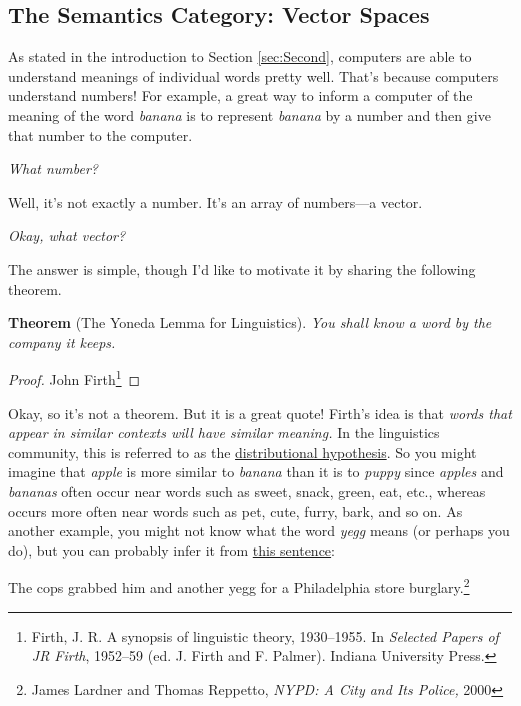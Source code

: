 \documentclass{tufte-handout-tai}
\theoremstyle{plain}
\newtheorem{thm}{Theorem}[section]
\theoremstyle{definition}
\theoremstyle{remark}
\begin{document}
\subsection*{The Semantics Category: Vector Spaces}
As stated in the introduction to Section \ref{sec:Second}, computers are able to understand meanings of individual words pretty well. That's because computers understand numbers! For example, a great way to inform a computer of the meaning of the word \textit{banana}  is to represent \textit{banana} by a number and then give that number to the computer.

\vspace{0.4cm}
\noindent \textit{What number?}
\vspace{0.4cm}

\noindent Well, it's not exactly a number. It's an array of numbers---a vector.

\vspace{0.4cm}
\noindent \textit{Okay, what vector?}
\vspace{0.4cm}

\noindent The answer is simple, though I'd like to motivate it by sharing the following theorem.

\vspace{0.4cm}
\noindent\textbf{Theorem} (The Yoneda Lemma for Linguistics). \textit{You shall know a word by the company it keeps.}
\begin{proof}
John Firth\footnote[][-1cm]{Firth, J. R. A synopsis of linguistic theory, 1930--1955. In \textit{Selected Papers of JR Firth}, 1952--59 (ed. J. Firth and F. Palmer). Indiana University Press.}
\end{proof}


Okay, so it's not a theorem. But it is a great quote! Firth's idea is that \textit{words that appear in similar contexts will have similar meaning.}  In the linguistics community, this is referred to as the \href{https://en.wikipedia.org/wiki/Distributional_semantics#Distributional_hypothesis}{distributional hypothesis}. So you might imagine that \textit{apple} is more similar to \textit{banana} than it is to \textit{puppy} since \textit{apples} and \textit{bananas} often occur near words such as sweet, snack, green, eat, etc., whereas  occurs more often near words such as pet, cute, furry, bark, and so on. As another example, you might not know what the word \textit{yegg} means (or perhaps you do), but you can probably infer it from \href{https://www.merriam-webster.com/word-of-the-day/yegg-2018-03-20}{this sentence}:
\begin{center}
\small
The cops grabbed him and another yegg for a Philadelphia store burglary.\footnote{James Lardner and Thomas Reppetto, \textit{NYPD: A City and Its Police,} 2000}
\end{center}
\end{document}

